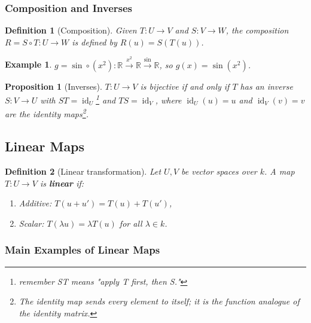 \documentclass{article}
\newtheorem{definition}{Definition}
\newtheorem*{example}{Example}
\newtheorem{proposition}{Proposition}
\begin{document}
\subsubsection{Composition and Inverses}
\begin{definition}[Composition]
    Given $T: U\to V$ and $S: V\to W$, the composition $R = S\circ T : U\to W$ is defined by $R(u) = S(T(u))$.
\end{definition}
\begin{example}
    $g = \sin\circ(x^2) : \mathbb{R}\xrightarrow{x^2}\mathbb{R}\xrightarrow{\sin}\mathbb{R}$, so $g(x)=\sin(x^2)$.
\end{example}
\begin{proposition}[Inverses]
    $T: U\to V$ is bijective if and only if $T$ has an inverse $S: V\to U$ with $ST = \operatorname{id}_U$\footnote{remember ST means "apply T first, then S."} and $TS = \operatorname{id}_V$, where $\operatorname{id}_U(u) = u$ and $\operatorname{id}_V(v) = v$ are the identity maps\footnote{The identity map sends every element to itself; it is the function analogue of the identity matrix.}.
\end{proposition}

\subsection{Linear Maps}

\begin{definition}[Linear transformation]
    Let $U,V$ be vector spaces over $k$. A map $T: U\to V$ is \textbf{linear} if:
    \begin{enumerate}
        \item Additive: $T(u+u') = T(u)+T(u')$,
        \item Scalar: $T(\lambda u) = \lambda T(u)$ for all $\lambda\in k$.
    \end{enumerate}
\end{definition}

\subsubsection{Main Examples of Linear Maps}
\end{document}
